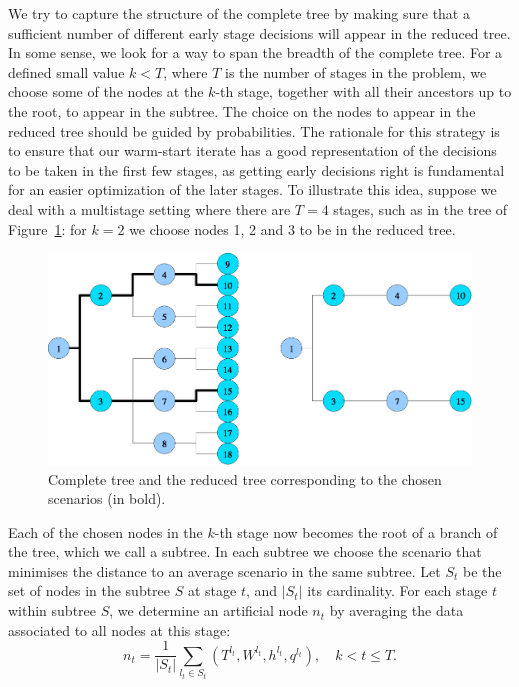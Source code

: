 We try to capture the structure of the complete tree by making sure 
that a sufficient number of different early stage decisions will 
appear in the reduced tree. In some sense, we look for a way to span 
the breadth of the complete tree. For a defined small value $k < T$, where 
$T$ is the number of stages in the problem, we choose some of the 
nodes at the $k$-th stage, together with all their ancestors up to the 
root, to appear in the subtree. The choice on the nodes to appear in
the reduced tree should be guided by probabilities.
The rationale for this strategy is to ensure that our warm-start 
iterate has a good representation of the decisions to be taken 
in the first few stages, as getting early decisions right is fundamental
for an easier optimization of the later stages.
%
To illustrate this idea, suppose we deal with a multistage setting where 
there are $T=4$ stages, such as in the tree of Figure~\ref{fig:Tree}: 
for $k=2$ we choose nodes 1, 2 and 3 to be in the reduced tree.
\begin{figure}[ht]
  \begin{center}
    \includegraphics[scale=.6]{figures/redtree.eps}
    \caption{Complete tree and the reduced tree corresponding to the
             chosen scenarios (in bold).}
    \label{fig:Tree}
  \end{center}
  \vspace{-3ex}
\end{figure}

Each of the chosen nodes in the $k$-th stage now becomes the root of a 
branch of the tree, which we call a subtree. In each subtree we choose 
the scenario that minimises the distance to an average scenario in the 
same subtree.
%
Let $S_t$ be the set of nodes in the subtree $S$ at stage $t$, and 
$|S_t|$ its cardinality. For each stage $t$ within subtree $S$, 
we determine an artificial node $n_t$ by averaging the data 
associated to all nodes at this stage:
\[
n_t = \frac{1}{|S_t|} \sum_{l_t \in S_t} (T^{l_t}, W^{l_t}, h^{l_t}, q^{l_t}),
\quad k < t \le T.
\]

